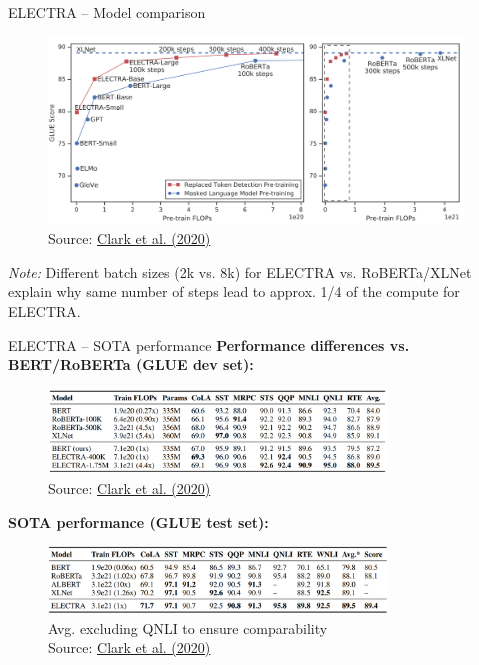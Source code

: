 \begin{frame}{ELECTRA -- Model comparison}
	
	\begin{figure}
		\centering
		\includegraphics[width = 11cm]{figure/electra-glue.png}\\ 
		\footnotesize{Source:} \href{https://arxiv.org/pdf/2003.10555.pdf}{\footnotesize Clark et al. (2020)}
	\end{figure}
	
{\footnotesize \textit{Note:} Different batch sizes (2k vs. 8k) for ELECTRA vs. RoBERTa/XLNet explain why same number of steps lead to approx. 1/4 of the compute for ELECTRA.}
\end{frame}


\begin{frame}{ELECTRA -- SOTA performance}
\small
	\textbf{Performance differences vs. BERT/RoBERTa (GLUE dev set):}

	\begin{figure}
		\centering
		\includegraphics[width = 9cm]{figure/electra-sota1.png}\\ 
		{\footnotesize Source: \href{https://arxiv.org/pdf/2003.10555.pdf}{Clark et al. (2020)}}
	\end{figure}

	\textbf{SOTA performance (GLUE test set):}

	\begin{figure}
		\centering
		\includegraphics[width = 9cm]{figure/electra-sota2.png}\\ 
		{\tiny * Avg. excluding QNLI to ensure comparability\\\footnotesize Source: \href{https://arxiv.org/pdf/2003.10555.pdf}{Clark et al. (2020)}}
	\end{figure}
\end{frame}


\endlecture

